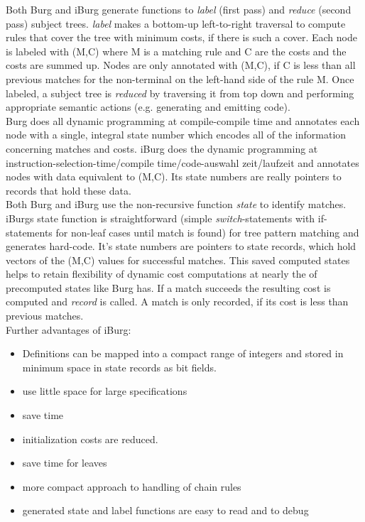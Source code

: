 \documentclass[a4paper,10pt]{article}
\begin{document}
Both Burg and iBurg generate functions to \textit{label} (first pass) and \textit{reduce} (second pass) subject trees. \textit{label} makes a bottom-up left-to-right traversal to compute rules that cover the tree with minimum costs, if there is such a cover. Each node is labeled with (M,C) where M is a matching rule and C are the costs and the costs are summed up. Nodes are only annotated with (M,C), if C is less than all previous matches for the non-terminal on the left-hand side of the rule M. Once labeled, a subject tree is \textit{reduced} by traversing it from top down and performing appropriate semantic actions (e.g. generating and emitting code).\\

Burg does all dynamic programming at compile-compile time and annotates each node with a single, integral state number which encodes all of the information concerning matches and costs. iBurg does the dynamic programming at instruction-selection-time/compile time/code-auswahl zeit/laufzeit and annotates nodes with data equivalent to (M,C). Its state numbers are really pointers to records that hold these data.\\

Both Burg and iBurg use the non-recursive function \textit{state} to identify matches. iBurgs state function is straightforward (simple \textit{switch}-statements with if-statements for non-leaf cases until match is found) for tree pattern matching and generates hard-code. It's state numbers are pointers to state records, which hold vectors of the (M,C) values for successful matches. This saved computed states helps to retain flexibility of dynamic cost computations at nearly the of precomputed states like Burg has. If a match succeeds the resulting cost is computed and \textit{record} is called. A match is only recorded, if its cost is less than previous matches.\\

Further advantages of iBurg:
\begin{itemize}
	\item Definitions can be mapped into a compact range of integers and stored in minimum space in state records as bit fields.
	\item use little space for large specifications
    \item save time
    \item initialization costs are reduced.
    \item save time for leaves
    \item more compact approach to handling of chain rules
    \item generated state and label functions are easy to read and to debug
\end{itemize}
\end{document}
